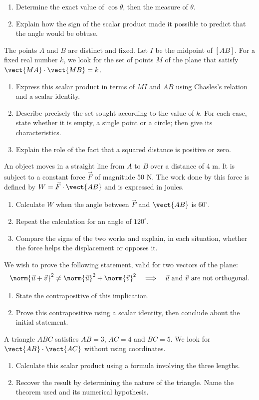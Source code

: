 \begin{enumerate}[label=\arabic*.]
\item Determine the exact value of $\cos\theta$, then the measure of $\theta$.
\item Explain how the sign of the scalar product made it possible to predict that the angle would be obtuse.
\end{enumerate}
The points $A$ and $B$ are distinct and fixed. Let $I$ be the midpoint of $[AB]$. For a fixed real number $k$, we look for the set of points $M$ of the plane that satisfy $\vect{MA}\cdot\vect{MB}=k$.
\begin{enumerate}[label=\arabic*.]
\item Express this scalar product in terms of $MI$ and $AB$ using Chasles's relation and a scalar identity.
\item Describe precisely the set sought according to the value of $k$. For each case, state whether it is empty, a single point or a circle; then give its characteristics.
\item Explain the role of the fact that a squared distance is positive or zero.
\end{enumerate}
An object moves in a straight line from $A$ to $B$ over a distance of 4 m. It is subject to a constant force $\vec F$ of magnitude 50 N. The work done by this force is defined by $W=\vec F\cdot\vect{AB}$ and is expressed in joules.
\begin{enumerate}[label=\arabic*.]
\item Calculate $W$ when the angle between $\vec F$ and $\vect{AB}$ is $60^\circ$.
\item Repeat the calculation for an angle of $120^\circ$.
\item Compare the signs of the two works and explain, in each situation, whether the force helps the displacement or opposes it.
\end{enumerate}
We wish to prove the following statement, valid for two vectors of the plane:\[\norm{\vec u+\vec v}^2\ne\norm{\vec u}^2+\norm{\vec v}^2\quad\Longrightarrow\quad \vec u\text{ and }\vec v\text{ are not orthogonal}.\]
\begin{enumerate}[label=\arabic*.]
\item State the contrapositive of this implication.
\item Prove this contrapositive using a scalar identity, then conclude about the initial statement.
\end{enumerate}
A triangle $ABC$ satisfies $AB=3$, $AC=4$ and $BC=5$. We look for $\vect{AB}\cdot\vect{AC}$ without using coordinates.
\begin{enumerate}[label=\arabic*.]
\item Calculate this scalar product using a formula involving the three lengths.
\item Recover the result by determining the nature of the triangle. Name the theorem used and its numerical hypothesis.
\end{enumerate}
